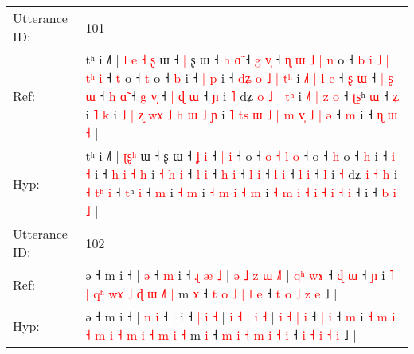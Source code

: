 \documentclass[10pt]{article}
\DeclareRobustCommand{\hl}[1]{{\textcolor{red}{#1}}}
\begin{document}
\begin{longtable}{ll}
 \\
\midrule
Utterance ID: & 101 \\
Ref: & tʰ i ˩˥ |\hl{ }\hl{l}\hl{ }\hl{e} \hl{˧}\hl{ }\hl{ʂ} ɯ ˧\hl{ }\hl{|} ʂ ɯ ˧ \hl{h} \hl{ɑ}\hl{̃} ˧ \hl{g} \hl{v}\hl{̩} ˧\hl{ }\hl{ɳ}\hl{ }\hl{ɯ}\hl{ }\hl{˩}\hl{ }\hl{|}\hl{ }\hl{n} o ˧\hl{ }\hl{b}\hl{ }\hl{i} \hl{˩} \hl{|} \hl{t}\hl{ʰ} \hl{i} ˧\hl{ }\hl{t} o ˧ \hl{t} o ˧ \hl{b} i ˧ \hl{|} \hl{p} i ˧\hl{ }\hl{d}\hl{ʑ} \hl{o} \hl{˩} \hl{|} \hl{t}\hl{ʰ} i\hl{ }\hl{˩}\hl{˥} \hl{|} \hl{l} \hl{e} ˧ \hl{ʂ} \hl{ɯ} ˧\hl{ }\hl{|} \hl{ʂ} \hl{ɯ} ˧ \hl{h} \hl{ɑ}\hl{̃} ˧ \hl{g} \hl{v}\hl{̩} ˧\hl{ }\hl{|} \hl{ɖ} \hl{ɯ} ˧ \hl{ɲ} i \hl{˥} dʑ\hl{ }\hl{o} \hl{˩} \hl{|} \hl{t}\hl{ʰ} i \hl{˩}\hl{˥} \hl{|}\hl{ }\hl{z} \hl{o} ˧ \hl{ʈ}\hl{ʂ}ʰ \hl{ɯ} ˧ \hl{ʑ} i \hl{˥} \hl{k} i\hl{ }\hl{˩}\hl{ }\hl{|}\hl{ }\hl{ʐ}\hl{ }\hl{w}\hl{ɤ} \hl{˩} \hl{h} \hl{ɯ} \hl{˩} \hl{ɲ} i\hl{ }\hl{˥} \hl{t}\hl{s} \hl{ɯ} \hl{˩} \hl{|} \hl{m} \hl{v}\hl{̩} \hl{˩} \hl{|} \hl{ə} ˧\hl{ }\hl{m} i ˧ \hl{ɳ} \hl{ɯ} \hl{˧} |
 \\
Hyp: & tʰ i ˩˥ |\hl{}\hl{}\hl{}\hl{} \hl{ʈ}\hl{ʂ}\hl{ʰ} ɯ ˧\hl{}\hl{} ʂ ɯ ˧ \hl{ʝ} \hl{}\hl{i} ˧ \hl{|} \hl{}\hl{i} ˧\hl{}\hl{}\hl{}\hl{}\hl{}\hl{}\hl{}\hl{}\hl{}\hl{} o ˧\hl{}\hl{}\hl{}\hl{} \hl{o} \hl{˧} \hl{}\hl{l} \hl{o} ˧\hl{}\hl{} o ˧ \hl{h} o ˧ \hl{h} i ˧ \hl{i} \hl{˧} i ˧\hl{}\hl{}\hl{} \hl{h} \hl{i} \hl{˧} \hl{}\hl{h} i\hl{}\hl{}\hl{} \hl{˧} \hl{h} \hl{i} ˧ \hl{l} \hl{i} ˧\hl{}\hl{} \hl{h} \hl{i} ˧ \hl{l} \hl{}\hl{i} ˧ \hl{l} \hl{}\hl{i} ˧\hl{}\hl{} \hl{l} \hl{i} ˧ \hl{l} i \hl{˧} dʑ\hl{}\hl{} \hl{i} \hl{˧} \hl{}\hl{h} i \hl{}\hl{˧} \hl{}\hl{t}\hl{ʰ} \hl{i} ˧ \hl{}\hl{t}ʰ \hl{i} ˧ \hl{m} i \hl{˧} \hl{m} i\hl{}\hl{}\hl{}\hl{}\hl{}\hl{}\hl{}\hl{}\hl{} \hl{˧} \hl{m} \hl{i} \hl{˧} \hl{m} i\hl{}\hl{} \hl{}\hl{˧} \hl{m} \hl{i} \hl{˧} \hl{i} \hl{}\hl{˧} \hl{i} \hl{˧} \hl{i} ˧\hl{}\hl{} i ˧ \hl{b} \hl{i} \hl{˩} |
 \\
\midrule
Utterance ID: & 102 \\
Ref: & ə ˧ m i ˧ |\hl{}\hl{} \hl{ə} ˧ \hl{m} i ˧ \hl{ɻ} \hl{æ} \hl{˩} | \hl{ə} \hl{˩} \hl{z} \hl{ɯ} \hl{˩}\hl{˥} | \hl{}\hl{q}\hl{ʰ} \hl{}\hl{w}\hl{ɤ} ˧ \hl{ɖ} \hl{ɯ} ˧ \hl{ɲ} i\hl{}\hl{} \hl{˥} \hl{|} \hl{}\hl{q}\hl{ʰ} \hl{}\hl{w}\hl{ɤ} \hl{˩} \hl{ɖ} \hl{ɯ} \hl{}\hl{˩}\hl{˥} \hl{|} m \hl{ɤ} ˧\hl{}\hl{} \hl{t} \hl{o} \hl{˩} \hl{|} \hl{l} \hl{e} ˧ \hl{t} \hl{o} \hl{˩} \hl{z} \hl{e} ˩ |
 \\
Hyp: & ə ˧ m i ˧ |\hl{ }\hl{n} \hl{i} ˧ \hl{|} i ˧ \hl{|} \hl{i} \hl{˧} | \hl{i} \hl{˧} \hl{|} \hl{i} \hl{}\hl{˧} | \hl{i}\hl{ }\hl{˧} \hl{|}\hl{ }\hl{i} ˧ \hl{|} \hl{i} ˧ \hl{m} i\hl{ }\hl{˧} \hl{m} \hl{i} \hl{˧}\hl{ }\hl{m} \hl{i}\hl{ }\hl{˧} \hl{m} \hl{i} \hl{˧} \hl{m}\hl{ }\hl{i} \hl{˧} m \hl{i} ˧\hl{ }\hl{m} \hl{i} \hl{˧} \hl{m} \hl{i} \hl{˧} \hl{i} ˧ \hl{i} \hl{˧} \hl{i} \hl{˧} \hl{i} ˩ |

\end{longtable}
\end{document}
